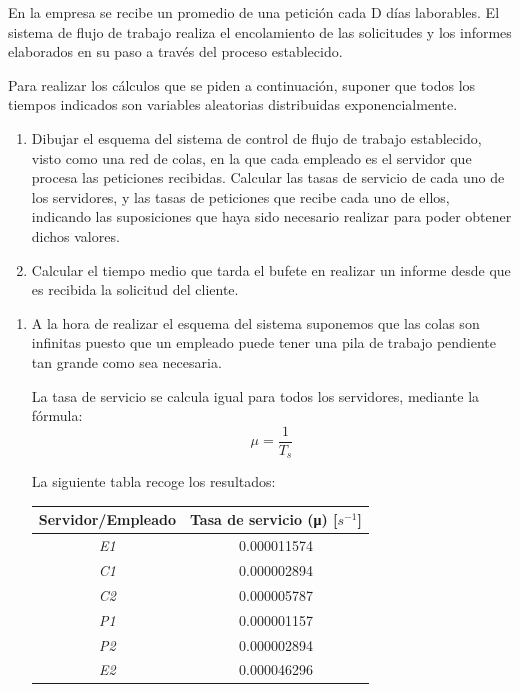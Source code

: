 \begin{problem}[21]
En la empresa se recibe un promedio de una petición cada D días laborables.
El sistema de flujo de trabajo realiza el encolamiento de las solicitudes y los informes elaborados en su paso a través del proceso establecido.

Para realizar los cálculos que se piden a continuación, suponer que todos los tiempos indicados son variables aleatorias distribuidas exponencialmente.
\begin{enumerate}
\item Dibujar el esquema del sistema de control de flujo de trabajo establecido, visto como una red de colas, en la que cada empleado es el servidor que procesa las peticiones recibidas. Calcular las tasas de servicio de cada uno de los servidores, y las tasas de peticiones que recibe cada uno de ellos, indicando las suposiciones que haya sido necesario realizar para poder obtener dichos valores.
\item Calcular el tiempo medio que tarda el bufete en realizar un informe desde que es recibida la solicitud del cliente.
\end{enumerate}

\solution

\yoP

\begin{enumerate}
\item


A la hora de realizar el esquema del sistema suponemos que las colas son infinitas puesto que un empleado puede tener una pila de trabajo pendiente tan grande como sea necesaria.

La tasa de servicio se calcula igual para todos los servidores, mediante la fórmula:
\[μ = \frac{1}{T_s}\]

La siguiente tabla recoge los resultados:


\begin{center}
\begin{tabular}{| c |  c |}
\hline
  \textbf{Servidor/Empleado}  & \textbf{Tasa de servicio (μ) [$s^{-1}$]}\\
\hline
 \textit{E1}& 0.000011574\\
 \textit{C1}& 0.000002894\\
 \textit{C2}& 0.000005787\\
 \textit{P1}& 0.000001157\\
 \textit{P2}& 0.000002894\\
 \textit{E2}& 0.000046296\\
\hline
\end{tabular}
\end{center}


\end{enumerate}
\end{problem}
